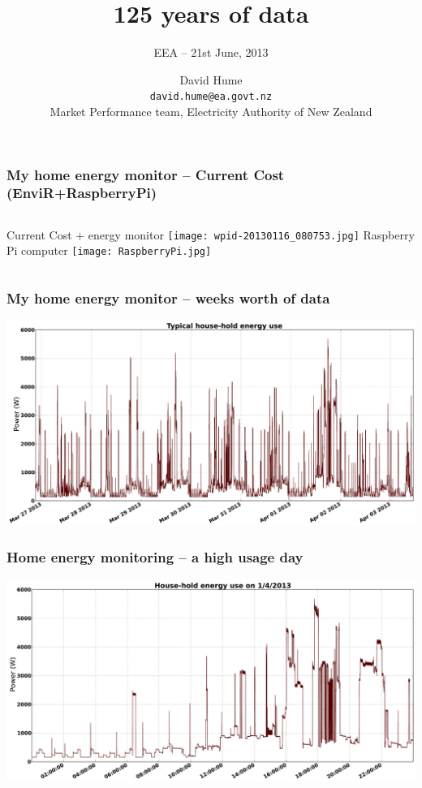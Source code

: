 \documentclass[aspectratio=169]{beamer}
\title[125 years of data]{\huge 125 years of data}
\subtitle{\tiny EEA -- 21st June, 2013} %
\author[David Hume]{\footnotesize David Hume\normalsize  \\ \tiny {\texttt{david.hume@ea.govt.nz}} \\ \tiny Market Performance team, Electricity Authority of New Zealand}
\date{}
\begin{document}
\frame{\titlepage}


\frame
{\frametitle{My home energy monitor -- Current Cost (EnviR+RaspberryPi)}
\begin{columns}[t]
  \column[T]{5cm}
  Current Cost + energy monitor
      \texttt{[image: wpid-20130116\_080753.jpg]} 
  \column[T]{5cm}
  \vspace{15mm}
  Raspberry Pi computer
  \texttt{[image: RaspberryPi.jpg]}
\end{columns}
}

\frame
{\frametitle{My home energy monitor -- weeks worth of data}
\begin{center}
\includegraphics[width=14cm]{./notebooks/125_years_of_data_files/125_years_of_data_fig_03.pdf} 
\end{center}
}


\frame
{\frametitle{Home energy monitoring -- a high usage day}
\begin{center}
\includegraphics[width=14cm]{./notebooks/125_years_of_data_files/125_years_of_data_fig_04.pdf} 
\end{center}
}
\end{document}
